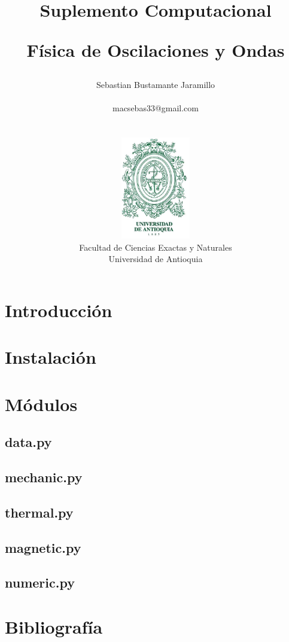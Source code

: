 \documentclass[10pt]{book}
\begin{document}
\title{Suplemento Computacional \\
\begin{Huge}
\textbf{Física de Oscilaciones y Ondas}
\end{Huge}}
\author{ Sebastian Bustamante Jaramillo\\ \begin{small}
macsebas33@gmail.com
\end{small} \\ \vspace{5cm} \\
\includegraphics[width=3cm]{UdeA_Shield} \\
Facultad de Ciencias Exactas y Naturales \\ 
Universidad de Antioquia }
\date{}

\maketitle


\newpage{\pagestyle{empty}\cleardoublepage}  

\tableofcontents
\newpage{\pagestyle{empty}\cleardoublepage}  

\chapter{Introducción}

\chapter{Instalación}

\chapter{Módulos}
	\section{data.py}
	\section{mechanic.py}
	\section{thermal.py}
	\section{magnetic.py}
	\section{numeric.py}

\chapter{Bibliografía}
\end{document}
